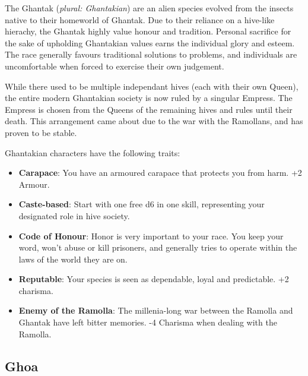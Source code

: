 \documentclass[10pt,twoside]{article}
\begin{document}
\begin{multicols}{2}
        The Ghantak (\textit{plural: Ghantakian}) are an alien species evolved from the insects native to their homeworld of Ghantak. Due to their reliance on a hive-like hierachy, the Ghantak highly value honour and tradition. Personal sacrifice for the sake of upholding Ghantakian values earns the individual glory and esteem. The race generally favours traditional solutions to problems, and individuals are uncomfortable when forced to exercise their own judgement.
        
         While there used to be multiple independant hives (each with their own Queen), the entire modern Ghantakian society is now ruled by a singular Empress. The Empress is chosen from the Queens of the remaining hives and rules until their death. This arrangement came about due to the war with the Ramollans, and has proven to be stable.
         
         Ghantakian characters have the following traits:
         
        \begin{itemize}
            \item \textbf{Carapace}: You have an armoured carapace that protects you from harm. +2 Armour.

            \item \textbf{Caste-based}: Start with one free d6 in one skill, representing your designated role in hive society.

            \item \textbf{Code of Honour}: Honor is very important to your race. You keep your word, won't abuse or kill prisoners, and generally tries to operate within the laws of the world they are on.

            \item \textbf{Reputable}: Your species is seen as dependable, loyal and predictable. +2 charisma.

            \item \textbf{Enemy of the Ramolla}: The millenia-long war between the Ramolla and Ghantak have left bitter memories. -4 Charisma when dealing with the Ramolla.
        \end{itemize}

        \subsection{Ghoa}
        

\end{multicols}
\end{document}
